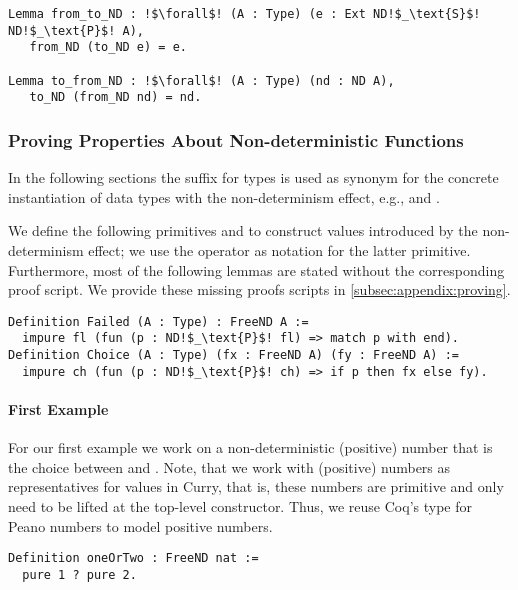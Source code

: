 \begin{verbatim}
Lemma from_to_ND : !$\forall$! (A : Type) (e : Ext ND!$_\text{S}$! ND!$_\text{P}$! A),
   from_ND (to_ND e) = e.

Lemma to_from_ND : !$\forall$! (A : Type) (nd : ND A),
   to_ND (from_ND nd) = nd.
\end{verbatim}

\subsubsection{Proving Properties About Non\--deterministic Functions}
\label{subsubsec:nondetProving}

In the following sections the suffix  for types is used as synonym for the concrete instantiation of data types with the non\--determinism effect, e.g.,  and .

We define the following primitives  and  to construct values introduced by the non\--determinism effect; we use the operator  as notation for the latter primitive.
Furthermore, most of the following lemmas are stated without the corresponding proof script.
We provide these missing proofs scripts in \autoref{subsec:appendix:proving}.

\begin{verbatim}
Definition Failed (A : Type) : FreeND A :=
  impure fl (fun (p : ND!$_\text{P}$! fl) => match p with end).
Definition Choice (A : Type) (fx : FreeND A) (fy : FreeND A) :=
  impure ch (fun (p : ND!$_\text{P}$! ch) => if p then fx else fy).
\end{verbatim}

\paragraph{First Example}
\label{par:firstNDExample}
For our first example we work on a non\--deterministic (positive) number that is the choice between  and .
Note, that we work with (positive) numbers as representatives for  values in Curry, that is, these numbers are primitive and only need to be lifted at the top\--level constructor.
Thus, we reuse Coq's type for Peano numbers  to model positive numbers.

\begin{verbatim}
Definition oneOrTwo : FreeND nat :=
  pure 1 ? pure 2.
\end{verbatim}

